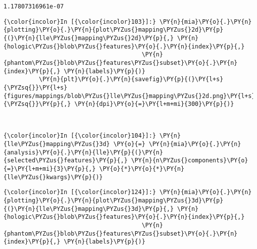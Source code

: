     \begin{Verbatim}[commandchars=\\\{\}]
1.17807316961e-07
    \end{Verbatim}

    \begin{Verbatim}[commandchars=\\\{\}]
{\color{incolor}In [{\color{incolor}103}]:} \PY{n}{mia}\PY{o}{.}\PY{n}{plotting}\PY{o}{.}\PY{n}{plot\PYZus{}mapping\PYZus{}2d}\PY{p}{(}\PY{n}{lle\PYZus{}mapping\PYZus{}2d}\PY{p}{,} \PY{n}{hologic\PYZus{}blob\PYZus{}features}\PY{o}{.}\PY{n}{index}\PY{p}{,}
                                       \PY{n}{phantom\PYZus{}blob\PYZus{}features\PYZus{}subset}\PY{o}{.}\PY{n}{index}\PY{p}{,} \PY{n}{labels}\PY{p}{)}
          \PY{n}{plt}\PY{o}{.}\PY{n}{savefig}\PY{p}{(}\PY{l+s}{\PYZsq{}}\PY{l+s}{figures/mappings/blob\PYZus{}lle\PYZus{}mapping\PYZus{}2d.png}\PY{l+s}{\PYZsq{}}\PY{p}{,} \PY{n}{dpi}\PY{o}{=}\PY{l+m+mi}{300}\PY{p}{)}
\end{Verbatim}

    \begin{center}
    \end{center}
    { \hspace*{\fill} \\}

    \begin{Verbatim}[commandchars=\\\{\}]
{\color{incolor}In [{\color{incolor}104}]:} \PY{n}{lle\PYZus{}mapping\PYZus{}3d} \PY{o}{=} \PY{n}{mia}\PY{o}{.}\PY{n}{analysis}\PY{o}{.}\PY{n}{lle}\PY{p}{(}\PY{n}{selected\PYZus{}features}\PY{p}{,} \PY{n}{n\PYZus{}components}\PY{o}{=}\PY{l+m+mi}{3}\PY{p}{,} \PY{o}{*}\PY{o}{*}\PY{n}{lle\PYZus{}kwargs}\PY{p}{)}
\end{Verbatim}

    \begin{Verbatim}[commandchars=\\\{\}]
{\color{incolor}In [{\color{incolor}124}]:} \PY{n}{mia}\PY{o}{.}\PY{n}{plotting}\PY{o}{.}\PY{n}{plot\PYZus{}mapping\PYZus{}3d}\PY{p}{(}\PY{n}{lle\PYZus{}mapping\PYZus{}3d}\PY{p}{,} \PY{n}{hologic\PYZus{}blob\PYZus{}features}\PY{o}{.}\PY{n}{index}\PY{p}{,}
                                       \PY{n}{phantom\PYZus{}blob\PYZus{}features\PYZus{}subset}\PY{o}{.}\PY{n}{index}\PY{p}{,} \PY{n}{labels}\PY{p}{)}
\end{Verbatim}

